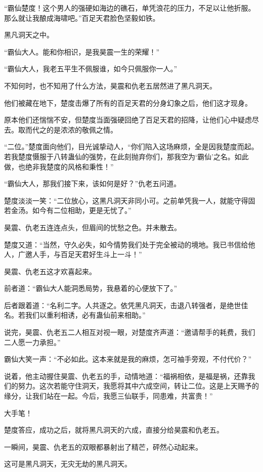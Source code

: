 \begin{this_body}
“霸仙楚度！这个男人的强硬如海边的礁石，单凭浪花的压力，不足以让他折服。那么就让我酿成海啸吧。”百足天君脸色坚毅如铁。

黑凡洞天之中。

“霸仙大人。能和你相识，是我昊震一生的荣耀！”

“霸仙大人，我老五平生不佩服谁，如今只佩服你一人。”

不知何时，也不知用了什么方法，昊震和仇老五居然进了黑凡洞天。

他们被藏在地下，楚度击爆了所有的百足天君的分身幻象之后，他们这才现身。

原本他们还惴惴不安，但楚度当面强硬回绝了百足天君的招降，让他们心中疑虑尽去。取而代之的是浓浓的敬佩之情。

“二位。”楚度面向他们，目光诚挚动人，“你们陷入这场麻烦，全是因我楚度而起。若我楚度慑服于八转蛊仙的强势，在此刻抛弃你们，那我空为‘霸仙’之名。如此做，也绝非我楚度的风格和秉性！”

“霸仙大人，那我们接下来，该如何是好？”仇老五问道。

楚度淡淡一笑：“二位放心，这黑凡洞天非同小可。之前单凭我一人，就能守得固若金汤。如今有二位相助，更是无忧了。”

昊震、仇老五连连点头，但眉间的忧愁之色。并未散去。

楚度又道：“当然，守久必失，如今情势我们处于完全被动的境地。我已书信给他人，广邀人手，与百足天君好生斗上一斗！”

昊震、仇老五这才欢喜起来。

前者道：“霸仙大人能洞悉局势，我悬着的心便放下了。”

后者跟着道：“名利二字。人共逐之。依凭黑凡洞天，击退八转强者，是绝世佳名。若我们以重利相诱，必有蛊仙前来相助。”

说完，昊震、仇老五二人相互对视一眼，对楚度齐声道：“邀请帮手的耗费，我们二人愿一力承担。”

霸仙大笑一声：“不必如此。这本来就是我的麻烦，怎可袖手旁观，不付代价？”

说着，他主动握住昊震、仇老五的手，动情地道：“福祸相依，是福是祸，还靠我们的努力。这次若能守住洞天，我愿将其中六成空间，转让二位。这是上天赐予的缘分，让我们站在一起。今后，我愿三仙联手，同患难，共富贵！”

大手笔！

楚度答应，成功之后，就将黑凡洞天的六成，直接分给昊震和仇老五。

一瞬间，昊震、仇老五的双眼都暴射出了精芒，砰然心动起来。

这可是黑凡洞天，无灾无劫的黑凡洞天。


\end{this_body}
